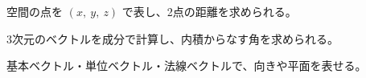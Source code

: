 \begin{furikaeri}
\begin{checklist}
\item 空間の点を $(x,\ y,\ z)$ で表し、2点の距離を求められる。
\item 3次元のベクトルを成分で計算し、内積からなす角を求められる。
\item 基本ベクトル・単位ベクトル・法線ベクトルで、向きや平面を表せる。
\end{checklist}
\end{furikaeri}

